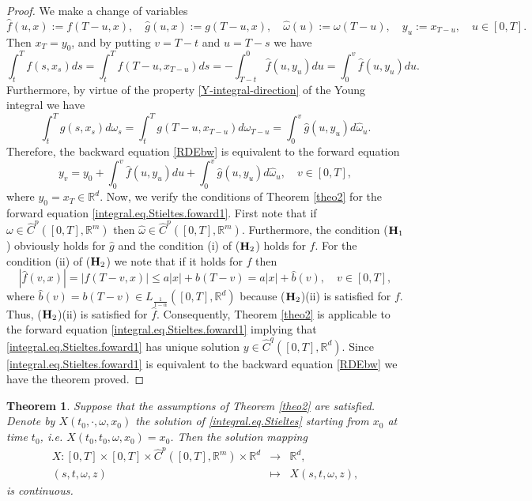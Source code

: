 \documentclass[10pt]{article}
\numberwithin{equation}{section} %
\newcommand{\R}{\ensuremath{\mathbb{R}}}
\newtheorem{theorem}{Theorem}[section]
{ \theorembodyfont{\normalfont} %
\newtheorem{example}[theorem]{Example}
\newtheorem{remark}[theorem]{Remark}
}
\begin{document}
\begin{proof}
We make a change of variables
$$
{\hat f}(u,x) := f(T-u,x), \quad {\hat g}(u,x) := g(T-u,x),\quad 
{\hat \omega}(u) := \omega(T-u), \quad y_u := x_{T-u},\quad u\in [0,T].
$$
Then $x_T = y_0$, and by putting $v=T-t$ and $u=T-s$ we have 
$$
\int_t^T f(s,x_s) ds = \int_t^T f(T-u,x_{T-u}) ds = -\int_{T-t}^0 {\hat f}(u,y_u) du = \int_0^v {\hat f}(u,y_u) du.
$$
Furthermore,  by virtue of the property \eqref{Y-integral-direction}
 of the Young integral  we have
$$
\int_t^T g(s,x_s) d\omega_s
= \int_t^T  g(T-u,x_{T-u}) d\omega_{T-u} 
= \int_0^v {\hat g}(u,y_u) d{\hat \omega}_u.
$$
Therefore, the backward equation   \eqref{RDEbw} is equivalent to the forward equation
\begin{equation}\label{integral.eq.Stieltes.foward1}
 y_v = y_0 + \int_0^v {\hat f}(u,y_u) du +  \int_0^v {\hat g}(u,y_u) d{\hat \omega}_u, \quad v\in [0,T],
 \end{equation}
  where $y_0=x_T\in\R^d$. 
    Now, we verify the conditions of Theorem \ref{theo2} for the forward equation \eqref{integral.eq.Stieltes.foward1}. First note that if $\omega\in \widehat{C}^{p}([0,T],\R^m)$   then ${\hat \omega}\in \widehat{C}^{p}([0,T],\R^m)$. Furthermore, 
 the condition (${\textbf H}_1$) obviously holds for $\hat g$ and the condition (i) of (${\textbf H}_2$)  holds for $\hat f$. For the condition (ii) of (${\textbf H}_2$) we note that if it holds for $f$ then
  $$
  |{\hat f}(v,x)| = |f(T-v,x)| \leq a|x| + b(T-v) = a|x| + {\hat b}(v), \quad v\in [0,T],
  $$
  where 
${\hat b}(v) = b(T-v) \in L_\frac{1}{1- \alpha}([0,T],\R^d)$ because (${\textbf H}_2$)(ii) is satisfied for $f$. Thus,
(${\textbf H}_2$)(ii) is satisfied for $\hat f$. Consequently,  Theorem \ref{theo2} is applicable to the forward equation \eqref{integral.eq.Stieltes.foward1}  implying that \eqref{integral.eq.Stieltes.foward1}  has unique solution
$y\in \widehat{C}^{q}([0,T],\R^d)$. 
Since \eqref{integral.eq.Stieltes.foward1} is equivalent to 
the backward equation   \eqref{RDEbw} we have the theorem proved.
\end{proof}
\begin{theorem}\label{contsolution}
Suppose that the assumptions of  Theorem \ref{theo2} are satisfied. Denote by $X(t_0,\cdot,\omega,x_0)$ the solution of \eqref{integral.eq.Stieltes} starting from $x_0$ at time $t_0$, i.e. $X(t_0,t_0,\omega,x_0)=x_0$. Then the solution mapping 
\begin{eqnarray*}
X: [0,T]\times[0,T]\times \widehat{C}^{p}([0,T],\R^m)\times \R^d &\rightarrow& \R^d,\\
(s,t,\omega,z) &\mapsto& X(s,t,\omega,z),
\end{eqnarray*}
 is continuous.%
\end{theorem}
\end{document}
